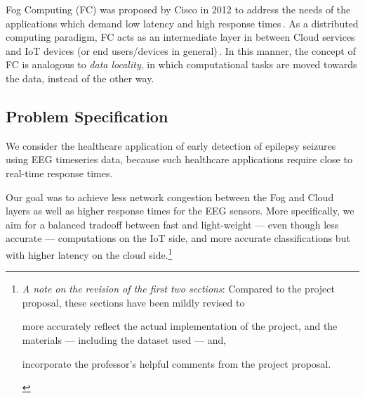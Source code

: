 \documentclass[letterpaper]{article}
\begin{document}
Fog Computing (FC) was proposed by Cisco in 2012 to address the needs of the applications which demand low latency and high response times\,\cite{cisco2012}. As a distributed computing paradigm, FC acts as an intermediate layer in between Cloud services and IoT devices (or end users/devices in general)\,\cite{Mahmud2018}. In this manner, the concept of FC is analogous to \emph{data locality}, in which computational tasks are moved towards the data, instead of the other way.




\subsection{Problem Specification}
We consider the healthcare application of early detection of epilepsy seizures using EEG timeseries data, because such healthcare applications require close to real-time response times.

Our goal was to achieve less network congestion between the Fog and Cloud layers as well as higher response times for the EEG sensors. More specifically, we aim for a balanced tradeoff between fast and light-weight --- even though less accurate --- computations on the IoT side, and more accurate classifications but with higher latency on the cloud side.\footnote{\emph{A note on the revision of the first two sections}: Compared to the project proposal, these sections have been mildly revised to \begin{enumerate*}[label=\arabic*)]
    \item more accurately reflect the actual implementation of the project, and the materials --- including the dataset used --- and,
    \item incorporate the professor's helpful comments from the project proposal.
  \end{enumerate*}}
\end{document}
